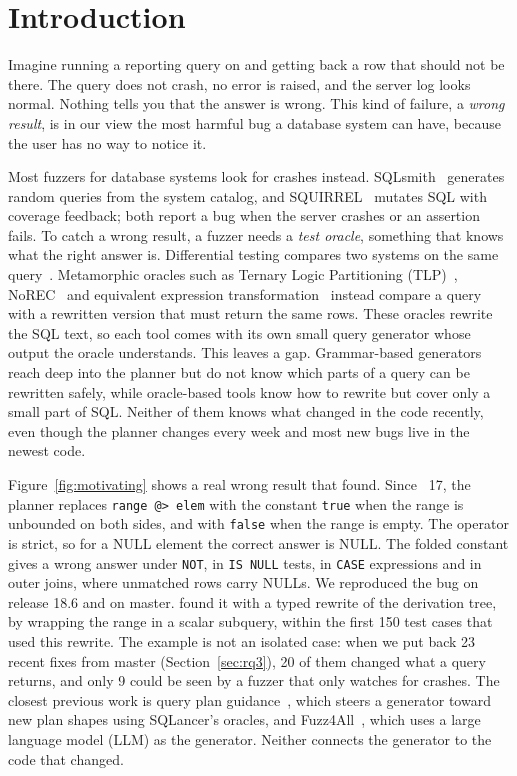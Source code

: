 \section{Introduction}
\label{sec:intro}

Imagine running a reporting query on \pg and getting back a row that should not
be there. The query does not crash, no error is raised, and the server log looks
normal. Nothing tells you that the answer is wrong. This kind of failure, a
\emph{wrong result}, is in our view the most harmful bug a database system can
have, because the user has no way to notice it.

Most fuzzers for database systems look for crashes instead.
SQLsmith~\cite{sqlsmith} generates random queries from the system catalog, and
SQUIRREL~\cite{zhong2020squirrel} mutates SQL with coverage feedback; both
report a bug when the server crashes or an assertion fails. To catch a wrong
result, a fuzzer needs a \emph{test oracle}, something that knows what the
right answer is. Differential testing compares two systems on the same
query~\cite{slutz1998rags}. Metamorphic oracles such as Ternary Logic
Partitioning (TLP)~\cite{rigger2020tlp}, NoREC~\cite{rigger2020norec} and
equivalent expression transformation~\cite{jiang2024eet} instead compare a query
with a rewritten version that must return the same rows. These oracles rewrite
the SQL text, so each tool comes with its own small query generator whose output
the oracle understands. This leaves a gap. Grammar-based generators reach deep
into the planner but do not know which parts of a query can be rewritten safely,
while oracle-based tools know how to rewrite but cover only a small part of SQL.
Neither of them knows what changed in the code recently, even though the \pg
planner changes every week and most new bugs live in the newest code.

Figure~\ref{fig:motivating} shows a real wrong result that \tool found. Since
\pg~17, the planner replaces \texttt{range @> elem} with the constant
\texttt{true} when the range is unbounded on both sides, and with \texttt{false}
when the range is empty. The operator is strict, so for a NULL element the
correct answer is NULL. The folded constant gives a wrong answer under
\texttt{NOT}, in \texttt{IS NULL} tests, in \texttt{CASE} expressions and in
outer joins, where unmatched rows carry NULLs. We reproduced the bug on release
18.6 and on master. \tool found it with a typed rewrite of the derivation tree,
by wrapping the range in a scalar subquery, within the first 150 test cases that
used this rewrite. The example is not an isolated case: when we put back 23
recent fixes from \pg master (Section~\ref{sec:rq3}), 20 of them changed what a
query returns, and only 9 could be seen by a fuzzer that only watches for
crashes. The closest previous work is query plan guidance~\cite{ba2023qpg},
which steers a generator toward new plan shapes using SQLancer's oracles, and
Fuzz4All~\cite{xia2024fuzz4all}, which uses a large language model (LLM) as the
generator. Neither connects the generator to the code that changed.


